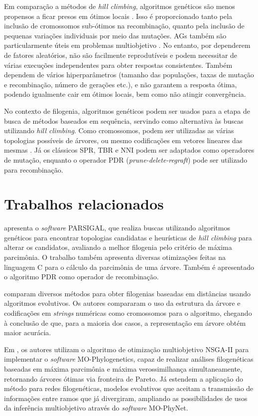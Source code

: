 \documentclass[12pt]{article}
\begin{document}
Em comparação a métodos de \emph{hill climbing}, algoritmos genéticos são menos propensos a ficar presos em ótimos locais \cite{garli}. Isso é proporcionado tanto pela inclusão de cromossomos sub-ótimos na recombinação, quanto pela inclusão de pequenas variações individuais por meio das mutações. AGs também são particularmente úteis em problemas multiobjetivo \cite{mo-phylogenetics}. No entanto, por dependerem de fatores aleatórios, não são facilmente reprodutíveis e podem necessitar de várias execuções independentes para obter respostas consistentes. Também dependem de vários hiperparâmetros (tamanho das populações, taxas de mutação e recombinação, número de gerações etc.), e não garantem a resposta ótima, podendo igualmente cair em ótimos locais, bem como não atingir convergência.

No contexto de filogenia, algoritmos genéticos podem ser usados para a etapa de busca de métodos baseados em sequência, servindo como alternativa às buscas utilizando \emph{hill climbing}. Como cromossomos, podem ser utilizadas as várias topologias possíveis de árvores, ou mesmo codificações em vetores lineares das mesmas \cite{cotta2002inferring}. Já os clássicos SPR, TBR e NNI podem ser adaptados como operadores de mutação, enquanto o operador PDR (\emph{prune-delete-regraft}) pode ser utilizado para recombinação.

\section{Trabalhos relacionados}

\cite{parsigal} apresenta o \emph{software} PARSIGAL, que realiza buscas utilizando algoritmos genéticos para encontrar topologias candidatas e heurísticas de \emph{hill climbing} para alterar os candidatos, avaliando a melhor filogenia pelo critério de máxima parcimônia. O trabalho também apresenta diversas otimizações feitas na linguagem C para o cálculo da parcimônia de uma árvore. Também é apresentado o algoritmo PDR como operador de recombinação.
  
\cite{cotta2002inferring} comparam diversos métodos para obter filogenias baseadas em distâncias usando algoritmos evolutivos. Os autores compararam o uso da estrutura da árvore e codificações em \emph{strings} numéricas como cromossomos para o algoritmo, chegando à conclusão de que, para a maioria dos casos, a representação em árvore obtém maior acurácia.

Em \cite{mo-phylogenetics}, os autores utilizam o algoritmo de otimização multiobjetivo NSGA-II para implementar o \emph{software} MO-Phylogenetics, capaz de realizar análises filogenéticas baseadas em máxima parcimônia e máxima verossimilhança simultaneamente, retornando árvores ótimas via fronteira de Pareto. Já \cite{mo-phynet} estendem a aplicação do método para redes filogenéticas, modelos evolutivos que aceitam a transmissão de informações entre ramos que já divergiram, ampliando as possibilidades de usos da inferência multiobjetivo através do \emph{software} MO-PhyNet.
\end{document}
